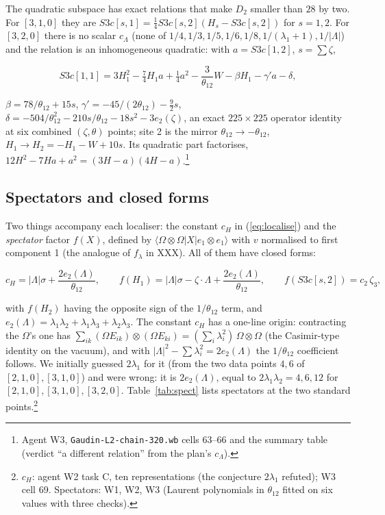 \documentclass[11pt]{article}
\begin{document}
The quadratic subspace has exact relations that make $D_2$ smaller than $28$ by two.
For $[3,1,0]$ they are $S3c[s,1]=\tfrac14S3c[s,2](H_s-S3c[s,2])$ for $s=1,2$. For $[3,2,0]$ there is no scalar $c_\Lambda$ (none of $1/4,1/3,1/5,1/6,1/8,1/(\lambda_1+1),1/|\Lambda|$) and the relation is an inhomogeneous quadratic: with $a=S3c[1,2]$, $s=\sum\zeta$,

\begin{equation}
S3c[1,1]=3H_1^2-\tfrac74H_1a+\tfrac14a^2-\frac3{\theta_{12}}W-\beta H_1-\gamma'a-\delta,\label{eq:D2rel}
\end{equation}

$\beta=78/\theta_{12}+15s$, $\gamma'=-45/(2\theta_{12})-\tfrac92s$, $\delta=-504/\theta_{12}^2-210s/\theta_{12}-18s^2-3e_2(\zeta)$, an exact $225\times225$ operator identity at six combined $(\zeta,\theta)$ points; site 2 is the mirror $\theta_{12}\to-\theta_{12}$, $H_1\to H_2=-H_1-W+10s$. Its quadratic part factorises, $12H^2-7Ha+a^2=(3H-a)(4H-a)$.\footnote{Agent W3, \texttt{Gaudin-\allowbreak{}L2-\allowbreak{}chain-\allowbreak{}320.\allowbreak{}wb} cells 63--66 and the summary table (verdict ``a different relation'' from the plan's $c_\Lambda$).}

\subsection{Spectators and closed forms}\label{sec:spect}

Two things accompany each localiser: the constant $c_H$ in (\ref{eq:localise}) and the \emph{spectator} factor $f(X)$, defined by $\langle\Omega\otimes\Omega|X|e_1\otimes e_1\rangle$ with $v$ normalised to first component 1 (the analogue of $f_\lambda$ in XXX).
All of them have closed forms:

\begin{equation}
c_H=|\Lambda|\sigma+\frac{2e_2(\Lambda)}{\theta_{12}},\qquad f(H_1)=|\Lambda|\sigma-\zeta\cdot\Lambda+\frac{2e_2(\Lambda)}{\theta_{12}},\qquad f(S3c[s,2])=c_2\,\zeta_3,\label{eq:spect}
\end{equation}

with $f(H_2)$ having the opposite sign of the $1/\theta_{12}$ term, and $e_2(\Lambda)=\lambda_1\lambda_2+\lambda_1\lambda_3+\lambda_2\lambda_3$. The constant $c_H$ has a one-line origin: contracting the $\Omega$'s one has $\sum_{ik}(\Omega E_{ik})\otimes(\Omega E_{ki})=(\sum_i\lambda_i^2)\,\Omega\otimes\Omega$ (the Casimir-type identity on the vacuum), and with $|\Lambda|^2-\sum\lambda_i^2=2e_2(\Lambda)$ the $1/\theta_{12}$ coefficient follows.
We initially guessed $2\lambda_1$ for it (from the two data points $4,6$ of $[2,1,0],[3,1,0]$) and were wrong: it is $2e_2(\Lambda)$, equal to $2\lambda_1\lambda_2=4,6,12$ for $[2,1,0],[3,1,0],[3,2,0]$. Table~\ref{tab:spect} lists spectators at the two standard points.\footnote{$c_H$: agent W2 task C, ten representations (the conjecture $2\lambda_1$ refuted); W3 cell 69.
Spectators: W1, W2, W3 (Laurent polynomials in $\theta_{12}$ fitted on six values with three checks).}
\end{document}
